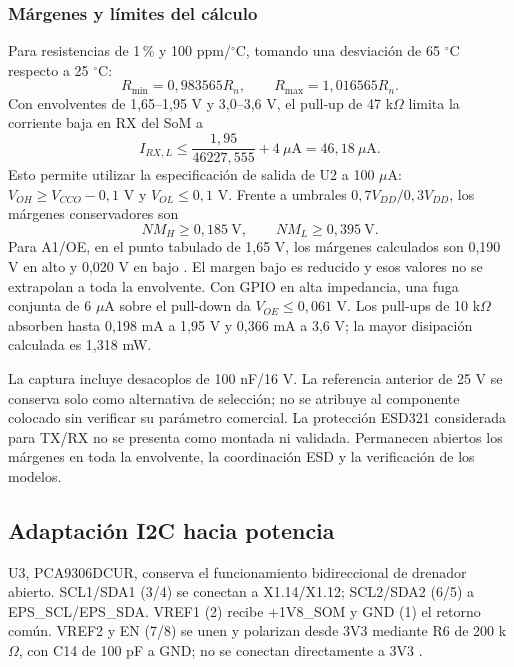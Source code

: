 \documentclass[11pt,letterpaper]{article}
\begin{document}
\subsubsection{Márgenes y límites del cálculo}
Para resistencias de 1\,\% y 100 ppm/$^\circ$C, tomando una desviación de 65 $^\circ$C respecto a 25 $^\circ$C:
\begin{equation}
R_{\min}=0,983565R_n,\qquad R_{\max}=1,016565R_n.
\end{equation}
Con envolventes de 1,65--1,95 V y 3,0--3,6 V, el pull-up de 47 k$\Omega$ limita la corriente baja en RX del SoM a
\begin{equation}
I_{RX,L}\leq\frac{1,95}{46227,555}+4\ \mu\mathrm{A}=46,18\ \mu\mathrm{A}.
\end{equation}
Esto permite utilizar la especificación de salida de U2 a 100 $\mu$A: $V_{OH}\geq V_{CCO}-0,1$ V y $V_{OL}\leq0,1$ V. Frente a umbrales $0,7V_{DD}/0,3V_{DD}$, los márgenes conservadores son
\begin{equation}
NM_H\geq0,185\ \mathrm{V},\qquad NM_L\geq0,395\ \mathrm{V}.
\end{equation}
Para A1/OE, en el punto tabulado de 1,65 V, los márgenes calculados son 0,190 V en alto y 0,020 V en bajo \cite{txu0202,imx8mpiec}. El margen bajo es reducido y esos valores no se extrapolan a toda la envolvente. Con GPIO en alta impedancia, una fuga conjunta de 6 $\mu$A sobre el pull-down da $V_{OE}\leq0,061$ V. Los pull-ups de 10 k$\Omega$ absorben hasta 0,198 mA a 1,95 V y 0,366 mA a 3,6 V; la mayor disipación calculada es 1,318 mW.

La captura incluye desacoplos de 100 nF/16 V. La referencia anterior de 25 V se conserva solo como alternativa de selección; no se atribuye al componente colocado sin verificar su parámetro comercial. La protección ESD321 considerada para TX/RX no se presenta como montada ni validada. Permanecen abiertos los márgenes en toda la envolvente, la coordinación ESD y la verificación de los modelos.

\subsection{Adaptación I2C hacia potencia}
U3, PCA9306DCUR, conserva el funcionamiento bidireccional de drenador abierto. SCL1/SDA1 (3/4) se conectan a X1.14/X1.12; SCL2/SDA2 (6/5) a EPS\_SCL/EPS\_SDA. VREF1 (2) recibe +1V8\_SOM y GND (1) el retorno común. VREF2 y EN (7/8) se unen y polarizan desde 3V3 mediante R6 de 200 k$\Omega$, con C14 de 100 pF a GND; no se conectan directamente a 3V3 \cite{pca9306}.
\end{document}
